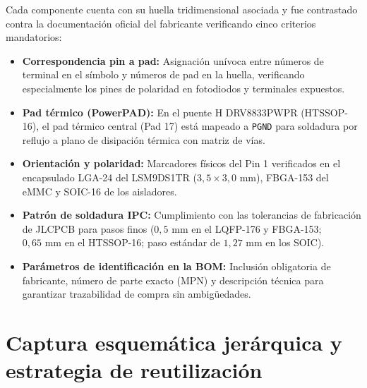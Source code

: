 \documentclass[11pt,a4paper]{article}
\begin{document}
Cada componente cuenta con su huella tridimensional asociada y fue contrastado contra la documentación oficial del fabricante verificando cinco criterios mandatorios:
\begin{itemize}
    \item \textbf{Correspondencia pin a pad:} Asignación unívoca entre números de terminal en el símbolo y números de pad en la huella, verificando especialmente los pines de polaridad en fotodiodos y terminales expuestos.
    \item \textbf{Pad térmico (PowerPAD):} En el puente H DRV8833PWPR (HTSSOP-16), el pad térmico central (Pad 17) está mapeado a \texttt{PGND} para soldadura por reflujo a plano de disipación térmica con matriz de vías.
    \item \textbf{Orientación y polaridad:} Marcadores físicos del Pin 1 verificados en el encapsulado LGA-24 del LSM9DS1TR ($3{,}5 \times 3{,}0\text{ mm}$), FBGA-153 del eMMC y SOIC-16 de los aisladores.
    \item \textbf{Patrón de soldadura IPC:} Cumplimiento con las tolerancias de fabricación de JLCPCB para pasos finos ($0{,}5\text{ mm}$ en el LQFP-176 y FBGA-153; $0{,}65\text{ mm}$ en el HTSSOP-16; paso estándar de $1{,}27\text{ mm}$ en los SOIC).
    \item \textbf{Parámetros de identificación en la BOM:} Inclusión obligatoria de fabricante, número de parte exacto (MPN) y descripción técnica para garantizar trazabilidad de compra sin ambigüedades.
\end{itemize}

\section{Captura esquemática jerárquica y estrategia de reutilización}
\end{document}

